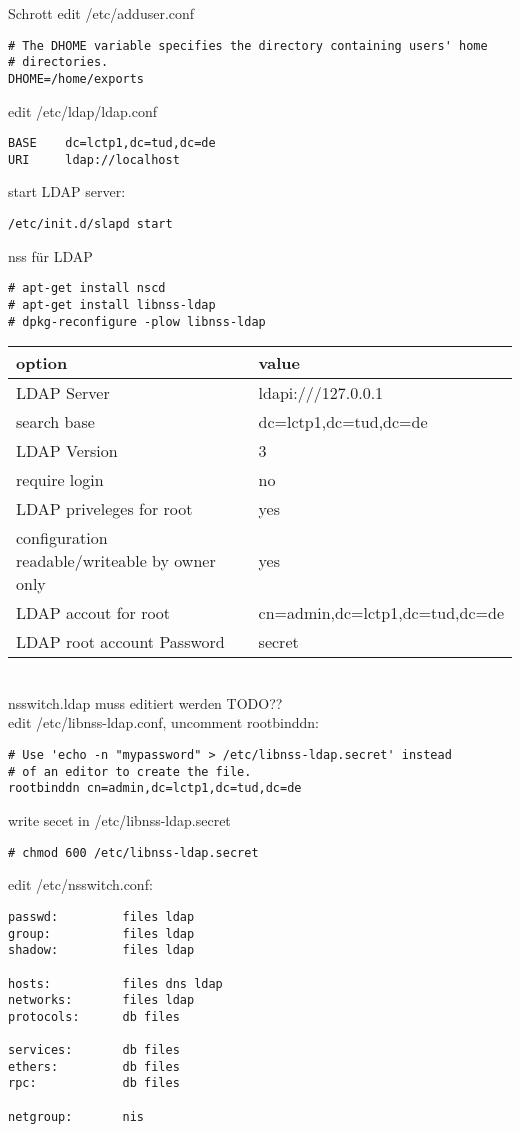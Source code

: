 Schrott
edit /etc/adduser.conf
\begin{lstlisting}[style=Bash]
# The DHOME variable specifies the directory containing users' home
# directories.
DHOME=/home/exports
\end{lstlisting}
edit /etc/ldap/ldap.conf 
\begin{lstlisting}[style=Bash]
BASE    dc=lctp1,dc=tud,dc=de
URI     ldap://localhost
\end{lstlisting}
start LDAP server:
\begin{lstlisting}[style=Bash]
/etc/init.d/slapd start
\end{lstlisting}
nss für LDAP
\begin{lstlisting}[style=Bash]
# apt-get install nscd
# apt-get install libnss-ldap
# dpkg-reconfigure -plow libnss-ldap
\end{lstlisting}
\begin{tabular}{ l | l }
 option & value\\
 \hline
 LDAP Server & ldapi:///127.0.0.1\\
 search base & dc=lctp1,dc=tud,dc=de\\
 LDAP Version & 3\\
 require login & no\\
 LDAP priveleges for root & yes\\
 configuration readable/writeable by owner only & yes\\
 LDAP accout for root & cn=admin,dc=lctp1,dc=tud,dc=de\\
 LDAP root account Password & secret\\
\end{tabular}
\\
nsswitch.ldap muss editiert werden TODO??\\
edit /etc/libnss-ldap.conf, uncomment rootbinddn:
\begin{lstlisting}[style=Bash]
# Use 'echo -n "mypassword" > /etc/libnss-ldap.secret' instead
# of an editor to create the file.
rootbinddn cn=admin,dc=lctp1,dc=tud,dc=de
\end{lstlisting}
write secet in /etc/libnss-ldap.secret
\begin{lstlisting}[style=Bash]
# chmod 600 /etc/libnss-ldap.secret 
\end{lstlisting}
edit /etc/nsswitch.conf:
\begin{lstlisting}[style=Bash]
passwd:         files ldap
group:          files ldap
shadow:         files ldap

hosts:          files dns ldap
networks:       files ldap
protocols:      db files

services:       db files
ethers:         db files
rpc:            db files

netgroup:       nis
\end{lstlisting}
